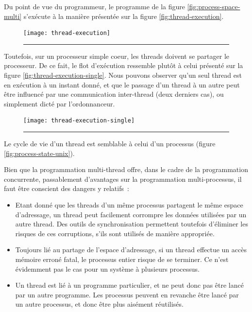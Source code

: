 Du point de vue du programmeur, le programme de la figure \ref{fig:process-space-multi} s'exécute à la manière présentée sur la figure \ref{fig:thread-execution}.

\begin{figure}[ht]
\begin{center}
\texttt{[image: thread-execution]}
\end{center}
\vspace{-.3cm}
\rule{\textwidth}{0.01in}
\end{figure}

Toutefois, sur un processeur simple coeur, les threads doivent se partager le processeur. De ce fait, le flot d'exécution ressemble plutôt à celui présenté sur la figure \ref{fig:thread-execution-single}. Nous pouvons observer qu'un seul thread est en exécution à un instant donné, et que le passage d'un thread à un autre peut être influencé par une communication inter-thread (deux derniers cas), ou simplement dicté par l'ordonnanceur.

\begin{figure}[ht]
\begin{center}
\texttt{[image: thread-execution-single]}
\end{center}
\vspace{-.3cm}
\rule{\textwidth}{0.01in}
\end{figure}

Le cycle de vie d'un thread est semblable à celui d'un processus (figure \ref{fig:process-state-unix}).

Bien que la programmation multi-thread offre, dans le cadre de la programmation concurrente, passablement d'avantages sur la programmation multi-processus, il faut être conscient des dangers y relatifs~:

\begin{itemize}
\item Etant donné que les threads d'un même processus partagent le même espace d'adressage, un thread peut facilement corrompre les données utilisées par un autre thread. Des outils de synchronisation permettent toutefois d'éliminer les risques de ces corruptions, s'ils sont utilisés de manière appropriée.

\item Toujours lié au partage de l'espace d'adressage, si un thread effectue un accès mémoire erroné fatal, le processus entier risque de se terminer. Ce n'est évidemment pas le cas pour un système à plusieurs processus.

\item Un thread est lié à un programme particulier, et ne peut donc pas être lancé par un autre programme. Les processus peuvent en revanche être lancé par un autre processus, et donc être plus aisément réutilisés.
\end{itemize}

